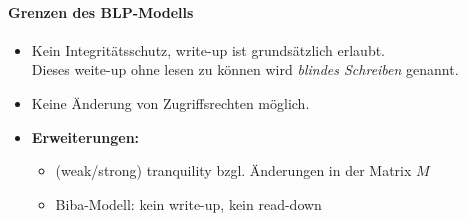 \documentclass[a4paper, 11pt, accentcolor = tud3b]{tudreport}
\begin{document}
	                \paragraph{Grenzen des BLP-Modells}
			            \begin{itemize}
			            	\item Kein Integritätsschutz, write-up ist grundsätzlich erlaubt. \\ Dieses weite-up ohne lesen zu können wird \textit{blindes Schreiben} genannt.
			            	\item Keine Änderung von Zugriffsrechten möglich.
			            	\item \textbf{Erweiterungen:}
				            	\begin{itemize}
					            	\item (weak/strong) tranquility bzgl. Änderungen in der Matrix \(M\)
				            		\item Biba-Modell: kein write-up, kein read-down
				            	\end{itemize}
			            \end{itemize}
\end{document}
